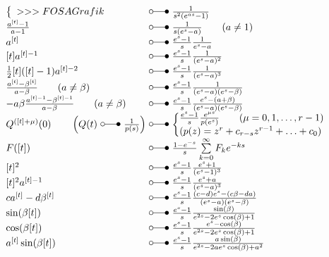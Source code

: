 \begin{footnotesize}
\[ \begin{array}{@{}l@{ ~ \laplace ~ }l@{}}
\left\lbrace\begin{array}{l}
>>>FOSA Grafik \\
\end{array}\right. &
    \frac{1}{s^2 (e^{as} - 1)} \\
\frac{a^{[t]} - 1}{a - 1} &
    \frac{1}{s (e^s - a)} \qquad (a \neq 1) \\
a^{[t]} &
    \frac{e^s - 1}{s} \frac{1}{e^s - a} \\
\lbrack t \rbrack a^{[t] - 1} &
    \frac{e^s - 1}{s} \frac{1}{(e^s - a)^2} \\
\frac{1}{2} [t] ([t] - 1) a^{[t] - 2} &
    \frac{e^s - 1}{s} \frac{1}{(e^s - a)^3} \\
\frac{a^{[t]} - \beta^{[t]}}{a - \beta} \qquad (a \neq \beta) &
    \frac{e^s - 1}{s} \frac{1}{(e^s - a) (e^s - \beta)} \\
- a \beta \frac{a^{[t] - 1} - \beta^{[t] - 1}}{a - \beta} \qquad (a \neq \beta) &
    \frac{e^s - 1}{s} \frac{e^s - (a + \beta)}{(e^s - a) (e^s - \beta)} \\
Q^{([t] + \mu)} (0) \qquad \left(Q(t) ~ \laplace ~ \frac{1}{p(s)}\right) &
    \left\lbrace\begin{array}{@{}l@{}}
    \frac{e^s - 1}{s} \frac{e^{\mu s}}{p(e^s)} \qquad (\mu = 0, 1, \ldots, r - 1) \\
    (p(z) = z^r + c_{r - s} z^{r - 1} + \ldots + c_0) \\
    \end{array}\right. \\
F([t]) &
    \frac{1 - e^{-s}}{s} \sum\limits_{k=0}^{\infty} F_k e^{-ks} \\
{[t]^2} &
    \frac{e^s - 1}{s} \frac{e^s + 1}{(e^s - 1)^3} \\
{[t]^2} a^{[t] - 1} &
    \frac{e^s - 1}{s} \frac{e^s + a}{(e^s - a)^3} \\
c a^{[t]} - d \beta^{[t]} &
    \frac{e^s - 1}{s} \frac{(c - d) e^s - (c \beta - d a)}{(e^s - a) (e^s - \beta)} \\
\sin(\beta[t]) &
    \frac{e^s - 1}{s} \frac{\sin(\beta)}{e^{2s} - 2 e^s \cos(\beta) + 1} \\
\cos(\beta [t]) &
    \frac{e^s - 1}{s} \frac{e^s - \cos(\beta)}{e^{2s} - 2 e^s \cos(\beta) + 1} \\
a^{[t]} \sin(\beta [t]) &
    \frac{e^s - 1}{s} \frac{a \sin(\beta)}{e^{2s} - 2 a e^s \cos(\beta) + a^2} \\

\end{array}\]
\end{footnotesize}
